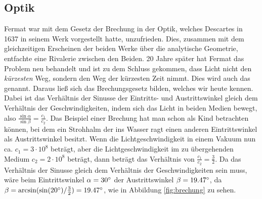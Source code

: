 \subsection{Optik} \label{sec:optik}
Fermat war mit dem Gesetz der \Gls{Brechung} in der \Gls{Optik}, welches Descartes in 1637 in seinem Werk vorgestellt hatte, unzufrieden. Dies, zusammen mit dem gleichzeitigen Erscheinen der beiden Werke über die \gls{analytische Geometrie}, entfachte eine Rivalerie zwischen den Beiden. 20 Jahre später hat Fermat das Problem neu behandelt und ist zu dem Schluss gekommen, dass Licht nicht den \textit{kürzesten} Weg, sondern den Weg der kürzesten Zeit nimmt. Dies wird auch das  genannt. Daraus ließ sich das Brechungsgesetz bilden, welches wir heute kennen. Dabei ist das Verhältnis der Sinusse der Eintritts- und Austrittswinkel gleich dem Verhältnis der Geschwindigkeiten, indem sich das Licht in beiden Medien bewegt, also $\frac{\sin\alpha}{\sin\beta} = \frac{c_1}{c_2}$. Das Beispiel einer Brechung hat man schon als Kind betrachten können, bei dem ein Strohhalm der ins Wasser ragt einen anderen Eintrittswinkel als Austrittswinkel besitzt. Wenn die Lichtgeschwindigkeit in einem Vakuum nun ca. $c_1 = 3 \cdot 10^8$ beträgt, aber die Lichtgeschwindigkeit im zu übergehenden Medium $c_2 = 2 \cdot 10^8$ beträgt, dann beträgt das Verhältnis von $\frac{c_1}{c_2} = \frac{3}{2}$. Da das Verhältnis der Sinusse gleich dem Verhältnis der Geschwindigkeiten sein muss, wäre beim Eintrittswinkel $\alpha = 30^\circ$ der Austrittswinkel $\beta = 19.47^\circ$, da $\beta = \arcsin(\sin(20^\circ) / \frac{3}{2}) = 19.47^\circ$, wie in Abbildung \ref{fig:brechung} zu sehen.

